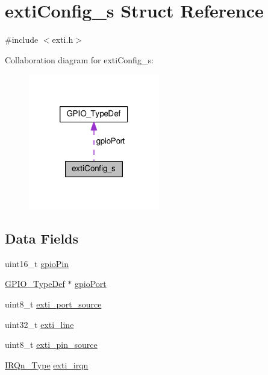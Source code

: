 \hypertarget{structextiConfig__s}{\section{exti\+Config\+\_\+s Struct Reference}
\label{structextiConfig__s}
}


{\ttfamily \#include $<$exti.\+h$>$}



Collaboration diagram for exti\+Config\+\_\+s\+:\nopagebreak
\begin{figure}[H]
\begin{center}
\leavevmode
\includegraphics[width=162pt]{structextiConfig__s__coll__graph}
\end{center}
\end{figure}
\subsection*{Data Fields}
\begin{DoxyCompactItemize}
\item 
uint16\+\_\+t \hyperlink{structextiConfig__s_ab9d8e1c9201223ef409639b4bf4b88ef}{gpio\+Pin}
\item 
\hyperlink{structGPIO__TypeDef}{G\+P\+I\+O\+\_\+\+Type\+Def} $\ast$ \hyperlink{structextiConfig__s_a88136309a310e397f365662945aed6f7}{gpio\+Port}
\item 
uint8\+\_\+t \hyperlink{structextiConfig__s_a18964764dc9268f931f19a178178611f}{exti\+\_\+port\+\_\+source}
\item 
uint32\+\_\+t \hyperlink{structextiConfig__s_a579b70764e0edb098831a8720b012320}{exti\+\_\+line}
\item 
uint8\+\_\+t \hyperlink{structextiConfig__s_ac7ba05efc8181d4c7e19694b77b265f9}{exti\+\_\+pin\+\_\+source}
\item 
\hyperlink{test_2unit_2platform_8h_a7e1129cd8a196f4284d41db3e82ad5c8}{I\+R\+Qn\+\_\+\+Type} \hyperlink{structextiConfig__s_ac38be8d6c22a159b76b09974d6599104}{exti\+\_\+irqn}
\end{DoxyCompactItemize}


